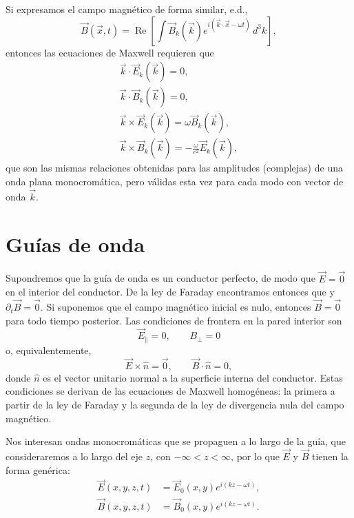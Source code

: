 Si expresamos el campo magnético de forma similar, e.d.,
\begin{equation}
\vec{B}(\vec{x},t) = \operatorname{Re}\left[\int\vec{B}_{k}(\vec{k})e^{i(\vec{k}\cdot\vec{x}-\omega t)}\,d^3k\right],
\end{equation}
entonces las ecuaciones de Maxwell requieren que
\begin{align}
\vec{k}\cdot\vec{E}_k(\vec{k})=0, \\
\vec{k}\cdot\vec{B}_k(\vec{k})=0, \\
\vec{k}\times\vec{E}_k(\vec{k})=\omega\vec{B}_k(\vec{k}) , \\
\vec{k}\times\vec{B}_k(\vec{k})=-\frac{\omega}{c^2}\vec{E}_k(\vec{k}),
\end{align}
que son las mismas relaciones obtenidas para las amplitudes (complejas) de una onda plana monocromática, pero válidas esta vez para cada modo con vector de onda $\vec{k}$.


\section{Guías de onda}
Supondremos que la guía de onda es un conductor perfecto, de modo que $\vec{E}=\vec{0}$ en el interior del conductor. De la ley de Faraday encontramos entonces que y $\partial_t\vec{B}=\vec{0}$. Si suponemos que el campo magnético inicial es nulo, entonces $\vec{B}=\vec{0}$ para todo tiempo posterior. Las condiciones de frontera en la pared interior son
\begin{equation}\label{CdBGO}
\vec{E}_\parallel=0, \qquad B_\perp=0
\end{equation}
o, equivalentemente, 
\begin{equation}
\vec{E}\times\hat{n}=\vec{0}, \qquad \vec{B}\cdot\hat{n}=0,
\end{equation}
donde $\hat{n}$ es el vector unitario normal a la superficie interna del conductor.
Estas condiciones se derivan de las ecuaciones de Maxwell homogéneas: la primera a partir de la ley de Faraday y la segunda de la ley de divergencia nula del campo magnético.

Nos interesan ondas monocromáticas que se propaguen a lo largo de la guía, que consideraremos a lo largo del eje $z$, con $-\infty<z<\infty$, por lo que $\vec{E}$ y $\vec{B}$ tienen la forma genérica:
\begin{equation}
\begin{aligned}
    \vec{E}(x, y, z, t) &= \vec{E}_0(x, y)e^{i(kz-\omega t)}, \\
    \vec{B}(x, y, z, t) &= \vec{B}_0(x, y)e^{i(kz-\omega t)}.
\end{aligned}
\label{eq:field_expressions}
\end{equation}

